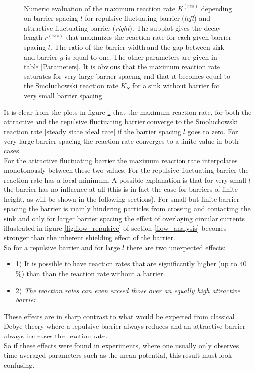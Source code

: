 \begin{figure}[t!]
\begin{minipage}[t]{.5 \textwidth}
\end{minipage}\\
\begin{minipage}[t]{1 \textwidth}
        \caption{Numeric evaluation of the maximum reaction rate $K^{(res)}$ depending on barrier spacing $l$ for repulsive fluctuating barrier (\emph{left}) and attractive fluctuating barrier (\emph{right}). The subplot gives the decay length $r^{(res)}$ that maximizes the reaction rate for each given barrier spacing $l$. The ratio of the barrier width and the gap between sink and barrier $g$ is equal to one. The other parameters are given in table \ref{Parameters}. It is obvious that the maximum reaction rate saturates for very large barrier spacing and that it becomes equal to the Smoluchowski reaction rate $K_S$ for a sink without barrier for very small barrier spacing. \label{fig:res_l}}
\end{minipage}
    \end{figure}
It is clear from the plots in figure \ref{fig:res_l} that the maximum reaction rate, for both the attractive and the repulsive fluctuating barrier converge to the Smoluchowski reaction rate \eqref{steady state ideal rate} if the barrier spacing $l$ goes to zero. For very large barrier spacing the reaction rate converges to a finite value in both cases. \\
For the attractive fluctuating barrier the maximum reaction rate interpolates monotonously between these two values. For the repulsive fluctuating barrier the reaction rate has a local minimum. A possible explanation is that for very small $l$ the barrier has no influence at all (this is in fact the case for barriers of finite height, as will be shown in the following sections). For small but finite barrier spacing the barrier is mainly hindering particles from crossing and contacting the sink and only for larger barrier spacing the effect of overlaying circular currents illustrated in figure \ref{fig:flow_repulsive} of section \ref{flow_analysis} becomes stronger than the inherent shielding effect of the barrier.\\
So for a repulsive barrier and for large $l$ there are two unexpected effects: 
\begin{itemize}
    \item{1)} It is possible to have reaction rates that are significantly higher (up to 40 \%) than than the reaction rate without a barrier. 
    \item{2)} \emph{The reaction rates can even exceed those over an equally high attractive barrier.}
\end{itemize}
These effects are in sharp contrast to what would be expected from classical Debye theory where a repulsive barrier always reduces and an attractive barrier always increases the reaction rate. \\
So if these effects were found in experiments, where one usually only observes time averaged parameters such as the mean potential, this result must look confusing. 

